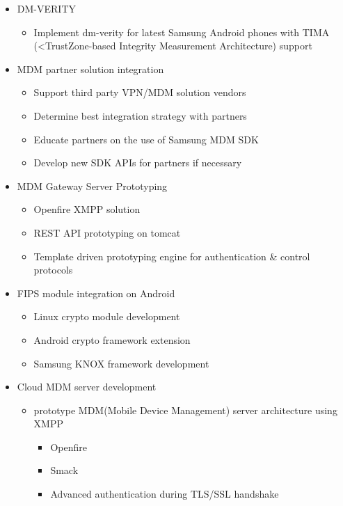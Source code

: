 \documentclass[11pt,a4paper,sans]{moderncv}        %
\begin{document}
\begin{itemize}%
\item DM-VERITY
  \begin{itemize}%
  \item Implement dm-verity for latest Samsung Android phones with TIMA (<TrustZone-based Integrity Measurement Architecture) support
  \end{itemize}
\item MDM partner solution integration
  \begin{itemize}%
  \item Support third party VPN/MDM solution vendors
  \item Determine best integration strategy with partners
  \item Educate partners on the use of Samsung MDM SDK
  \item Develop new SDK APIs for partners if necessary
  \end{itemize}
\item MDM Gateway Server Prototyping
  \begin{itemize}%
  \item Openfire XMPP solution
  \item REST API prototyping on tomcat
  \item Template driven prototyping engine for authentication \& control protocols
  \end{itemize}
\item FIPS module integration on Android
  \begin{itemize}%
  \item Linux crypto module development
  \item Android crypto framework extension
  \item Samsung KNOX framework development
  \end{itemize}
\item Cloud MDM server development
  \begin{itemize}%
  \item prototype MDM(Mobile Device Management) server architecture using XMPP
    \begin{itemize}%
    \item Openfire
    \item Smack
    \item Advanced authentication during TLS/SSL handshake
    \end{itemize}
  \end{itemize}
\end{itemize}
\end{document}
